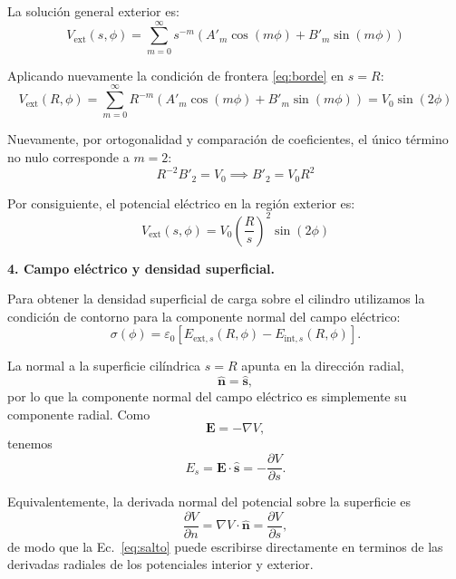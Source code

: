 \documentclass[11pt]{article}
\begin{document}
La solución general exterior es:
\begin{equation*}
V_{\text{ext}}(s, \phi) = \sum_{m=0}^{\infty} s^{-m} \left( A'_m \cos(m\phi) + B'_m \sin(m\phi) \right)
\end{equation*}

Aplicando nuevamente la condición de frontera \eqref{eq:borde} en $s = R$:
\begin{equation*}
V_{\text{ext}}(R, \phi) = \sum_{m=0}^{\infty} R^{-m} \left( A'_m \cos(m\phi) + B'_m \sin(m\phi) \right) = V_0 \sin(2\phi)
\end{equation*}

Nuevamente, por ortogonalidad y comparación de coeficientes, el único término no nulo corresponde a $m = 2$:
\begin{equation*}
R^{-2} B'_2 = V_0 \implies B'_2 = V_0 R^2
\end{equation*}

Por consiguiente, el potencial eléctrico en la región exterior es:
\begin{equation}\label{eq:potencial-ext}
V_{\text{ext}}(s, \phi) = V_0 \left( \frac{R}{s} \right)^2 \sin(2\phi)
\end{equation}

\textbf{4. Campo eléctrico y densidad superficial.}\par

Para obtener la densidad superficial de carga sobre el cilindro utilizamos
la condición de contorno para la componente normal del campo eléctrico:
\begin{equation}\label{eq:salto}
    \sigma(\phi)
    =
    \varepsilon_0
    \left[
        E_{\text{ext},s}(R,\phi)
        -
        E_{\text{int},s}(R,\phi)
    \right].
\end{equation}

La normal a la superficie cilíndrica $s=R$ apunta en la dirección radial,
\begin{equation*}
    \hat{\mathbf n}=\hat{\mathbf s},
\end{equation*}
por lo que la componente normal del campo eléctrico es simplemente su
componente radial. Como
\begin{equation*}
    \mathbf E=-\nabla V,
\end{equation*}
tenemos
\begin{equation*}
    E_s
    =
    \mathbf E\cdot\hat{\mathbf s}
    =
    -\frac{\partial V}{\partial s}.
\end{equation*}

Equivalentemente, la derivada normal del potencial sobre la superficie es
\begin{equation*}
    \frac{\partial V}{\partial n}
    =
    \nabla V\cdot\hat{\mathbf n}
    =
    \frac{\partial V}{\partial s},
\end{equation*}
de modo que la Ec.~\eqref{eq:salto} puede escribirse directamente en
terminos de las derivadas radiales de los potenciales interior y exterior.
\end{document}
